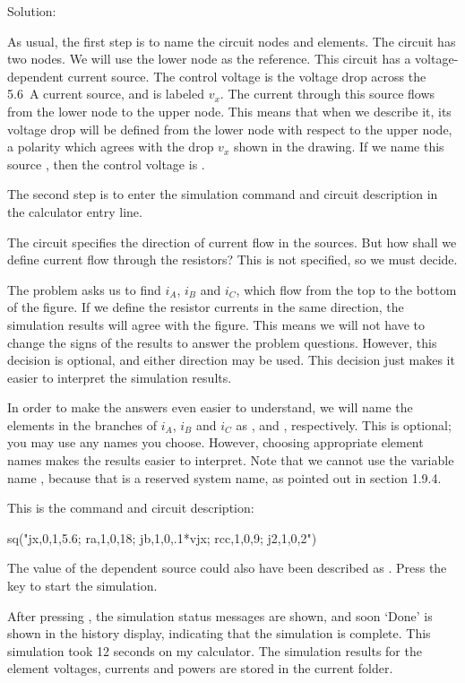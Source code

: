 Solution:

As usual, the first step is to name the circuit nodes and elements.
The circuit has two nodes. We will use the lower node as the
reference. This circuit has a voltage-dependent current source. The
control voltage is the voltage drop across the 5.6~A current source,
and is labeled $v_x$. The current through this source flows from the
lower node to the upper node. This means that when we describe it,
its voltage drop will be defined from the lower node with respect to
the upper node, a polarity which agrees with the drop $v_x$ shown in
the drawing. If we name this source , then the control
voltage is .

The second step is to enter the simulation command and circuit
description in the calculator entry line.

The circuit specifies the direction of current flow in the sources.
But how shall we define current flow through the resistors? This is
not specified, so we must decide.

The problem asks us to find $i_A$, $i_B$ and $i_C$, which flow from
the top to the bottom of the figure. If we define the resistor
currents in the same direction, the simulation results will agree
with the figure. This means we will not have to change the signs of
the results to answer the problem questions. However, this decision
is optional, and either direction may be used. This decision just
makes it easier to interpret the simulation results.

In order to make the answers even easier to understand, we will name
the elements in the branches of $i_A$, $i_B$ and $i_C$ as ,
 and , respectively. This is optional; you may
use any names you choose. However, choosing appropriate element
names makes the results easier to interpret. Note that we cannot use
the variable name , because that is a reserved system name,
as pointed out in section 1.9.4.

This is the command and circuit description:

\begin{entry}
sq\dc("jx,0,1,5.6; ra,1,0,18; jb,1,0,.1*vjx; rcc,1,0,9; j2,1,0,2")
\end{entry}

The value of the dependent source could also have been described as
. Press the  key to start the simulation.

After pressing , the simulation status messages are
shown, and soon `Done' is shown in the history display, indicating
that the simulation is complete. This simulation took 12 seconds on
my calculator. The simulation results for the element voltages,
currents and powers are stored in the current folder.

